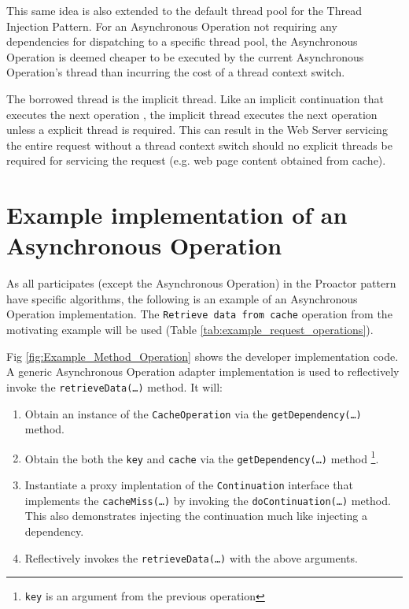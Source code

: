 \documentclass{article}
\begin{document}
This same idea is also extended to the default thread pool for the Thread
Injection Pattern.  For an Asynchronous Operation not requiring any dependencies
for dispatching to a specific thread pool, the Asynchronous Operation is deemed
cheaper to be executed by the current Asynchronous Operation's thread than
incurring the cost of a thread context switch.

The borrowed thread is the implicit thread.  Like an implicit continuation that
executes the next operation \cite{continuations}, the implicit thread executes
the next operation unless a explicit thread is required.  This can result in the
Web Server servicing the entire request without a thread context switch should
no explicit threads be required for servicing the request (e.g. web page content
obtained from cache).


\section{Example implementation of an Asynchronous Operation}

As all participates (except the Asynchronous Operation) in the Proactor pattern
have specific algorithms, the following is an example of an Asynchronous
Operation implementation.  The \texttt{Retrieve data from cache} operation from
the motivating example will be used (Table
\ref{tab:example_request_operations}).

Fig \ref{fig:Example_Method_Operation} shows the developer implementation code. 
A generic Asynchronous Operation adapter implementation is used to reflectively invoke
the \texttt{retrieveData(\ldots)} method. It will:
\begin{enumerate}
  \item Obtain an instance of the \texttt{CacheOperation} via the \texttt{getDependency(\ldots)} method.
  \item Obtain the both the \texttt{key} and \texttt{cache} via the \texttt{getDependency(\ldots)} method \footnote{\texttt{key} is an argument from the previous operation}.
  \item Instantiate a proxy implentation of the \texttt{Continuation} interface that implements the \texttt{cacheMiss(\ldots)} by invoking the \texttt{doContinuation(\ldots)} method.  This also demonstrates injecting the continuation much like injecting a dependency. 
  \item Reflectively invokes the \texttt{retrieveData(\ldots)} with the above arguments.
\end{enumerate}
\end{document}
